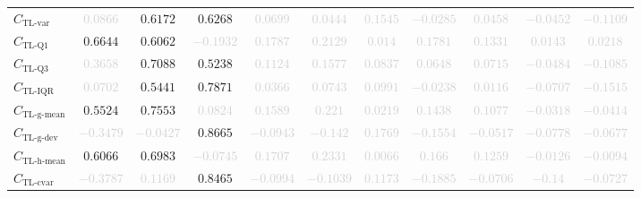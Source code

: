 \documentclass{standalone}
\newcommand{\tlvarname}{\text{TL-var}}
\newcommand{\tlvar}{C_{\tlvarname}}
\newcommand{\tlqonename}{\text{TL-Q1}}
\newcommand{\tlqone}{C_{\tlqonename}}
\newcommand{\tlqthreename}{\text{TL-Q3}}
\newcommand{\tlqthree}{C_{\tlqthreename}}
\newcommand{\tliqrname}{\text{TL-IQR}}
\newcommand{\tliqr}{C_{\tliqrname}}
\newcommand{\tlgmeanname}{\text{TL-g-mean}}
\newcommand{\tlgmean}{C_{\tlgmeanname}}
\newcommand{\tlgdevname}{\text{TL-g-dev}}
\newcommand{\tlgdev}{C_{\tlgdevname}}
\newcommand{\tlhmeanname}{\text{TL-h-mean}}
\newcommand{\tlhmean}{C_{\tlhmeanname}}
\newcommand{\tlcvariationname}{\text{TL-cvar}}
\newcommand{\tlcvariation}{C_{\tlcvariationname}}
\begin{document}
\begin{tabular}{lcccccccccc}
$\tlvar$ & \textcolor{lightgray}{$0.0866$} & $0.6172$ & $0.6268$ & \textcolor{lightgray}{$0.0699$} & \textcolor{lightgray}{$0.0444$} & \textcolor{lightgray}{$0.1545$} & \textcolor{lightgray}{$-0.0285$} & \textcolor{lightgray}{$0.0458$} & \textcolor{lightgray}{$-0.0452$} & \textcolor{lightgray}{$-0.1109$} \\ 
$\tlqone$ & $0.6644$ & $0.6062$ & \textcolor{lightgray}{$-0.1932$} & \textcolor{lightgray}{$0.1787$} & \textcolor{lightgray}{$0.2129$} & \textcolor{lightgray}{$0.014$} & \textcolor{lightgray}{$0.1781$} & \textcolor{lightgray}{$0.1331$} & \textcolor{lightgray}{$0.0143$} & \textcolor{lightgray}{$0.0218$} \\ 
$\tlqthree$ & \textcolor{lightgray}{$0.3658$} & $0.7088$ & $0.5238$ & \textcolor{lightgray}{$0.1124$} & \textcolor{lightgray}{$0.1577$} & \textcolor{lightgray}{$0.0837$} & \textcolor{lightgray}{$0.0648$} & \textcolor{lightgray}{$0.0715$} & \textcolor{lightgray}{$-0.0484$} & \textcolor{lightgray}{$-0.1085$} \\ 
$\tliqr$ & \textcolor{lightgray}{$0.0702$} & $0.5441$ & $0.7871$ & \textcolor{lightgray}{$0.0366$} & \textcolor{lightgray}{$0.0743$} & \textcolor{lightgray}{$0.0991$} & \textcolor{lightgray}{$-0.0238$} & \textcolor{lightgray}{$0.0116$} & \textcolor{lightgray}{$-0.0707$} & \textcolor{lightgray}{$-0.1515$} \\ 
$\tlgmean$ & $0.5524$ & $0.7553$ & \textcolor{lightgray}{$0.0824$} & \textcolor{lightgray}{$0.1589$} & \textcolor{lightgray}{$0.221$} & \textcolor{lightgray}{$0.0219$} & \textcolor{lightgray}{$0.1438$} & \textcolor{lightgray}{$0.1077$} & \textcolor{lightgray}{$-0.0318$} & \textcolor{lightgray}{$-0.0414$} \\ 
$\tlgdev$ & \textcolor{lightgray}{$-0.3479$} & \textcolor{lightgray}{$-0.0427$} & $0.8665$ & \textcolor{lightgray}{$-0.0943$} & \textcolor{lightgray}{$-0.142$} & \textcolor{lightgray}{$0.1769$} & \textcolor{lightgray}{$-0.1554$} & \textcolor{lightgray}{$-0.0517$} & \textcolor{lightgray}{$-0.0778$} & \textcolor{lightgray}{$-0.0677$} \\ 
$\tlhmean$ & $0.6066$ & $0.6983$ & \textcolor{lightgray}{$-0.0745$} & \textcolor{lightgray}{$0.1707$} & \textcolor{lightgray}{$0.2331$} & \textcolor{lightgray}{$0.0066$} & \textcolor{lightgray}{$0.166$} & \textcolor{lightgray}{$0.1259$} & \textcolor{lightgray}{$-0.0126$} & \textcolor{lightgray}{$-0.0094$} \\ 
$\tlcvariation$ & \textcolor{lightgray}{$-0.3787$} & \textcolor{lightgray}{$0.1169$} & $0.8465$ & \textcolor{lightgray}{$-0.0994$} & \textcolor{lightgray}{$-0.1039$} & \textcolor{lightgray}{$0.1173$} & \textcolor{lightgray}{$-0.1885$} & \textcolor{lightgray}{$-0.0706$} & \textcolor{lightgray}{$-0.14$} & \textcolor{lightgray}{$-0.0727$} \\ 

\end{tabular}
\end{document}
